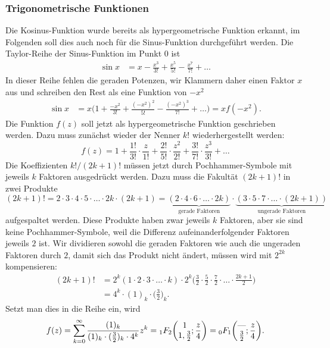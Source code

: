 %
%
\subsubsection{Trigonometrische Funktionen}
%
Die Kosinus-Funktion wurde bereits als hypergeometrische Funktion erkannt,
im Folgenden soll dies auch noch für die Sinus-Funktion
durchgeführt werden.
Die Taylor-Reihe der Sinus-Funktion im Punkt $0$ ist
\begin{align*}
\sin x
&=
x-\frac{x^3}{3!}+\frac{x^5}{5!}-\frac{x^7}{7!}+\dots
\end{align*}
In dieser Reihe fehlen die geraden Potenzen, wir Klammern daher einen
Faktor $x$ aus und schreiben den Rest als eine Funktion von $-x^2$
\begin{align*}
\sin x
&=
x
\biggl(
1+\frac{-x^2}{3!}+\frac{(-x^2)^2}{5!}-\frac{(-x^2)^3}{7!}+\dots
\biggr)
=
x f(-x^2).
\end{align*}
Die Funktion $f(z)$ soll jetzt als hypergeometrische Funktion geschrieben
werden.
Dazu muss zunächst wieder der Nenner $k!$ wiederhergestellt werden:
\begin{equation*}
f(z)
=
1
+
\frac{1!}{3!}\cdot \frac{z}{1!}
+
\frac{2!}{5!}\cdot \frac{z^2}{2!}
+
\frac{3!}{7!}\cdot \frac{z^3}{3!}
+
\dots
\end{equation*}
Die Koeffizienten $k!/(2k+1)!$ müssen jetzt durch Pochhammer-Symbole
mit jeweils $k$ Faktoren ausgedrückt werden.
Dazu muss die Fakultät $(2k+1)!$ in zwei Produkte
\[
(2k+1)!
=
2\cdot 3 \cdot 4\cdot 5\cdot \ldots \cdot 2k \cdot (2k+1)
=
\underbrace{(2\cdot 4 \cdot 6\cdot\ldots\cdot 2k)}_{\textstyle\text{gerade Faktoren}}
\cdot
\underbrace{(3\cdot 5\cdot 7\cdot \ldots \cdot (2k+1))}_{\textstyle\text{ungerade Faktoren}}
\]
aufgespaltet werden.
Diese Produkte haben zwar jeweils $k$ Faktoren, aber sie sind keine
Pochhammer-Symbole, weil die Differenz aufeinanderfolgender Faktoren 
jeweils $2$ ist.
Wir dividieren sowohl die geraden Faktoren wie auch die 
ungeraden Faktoren durch $2$, damit sich das Produkt nicht ändert,
müssen wird mit $2^{2k}$ kompensieren:
\begin{align*}
(2k+1)!
&=
2^k(1\cdot2\cdot3\cdot\ldots\cdot k)
\cdot
2^k
\biggl(
\frac{3}{2}\cdot
\frac{5}{2}\cdot
\frac{7}{2}\cdot
\ldots\cdot
\frac{2k+1}{2}
\biggr)
\\
&=
4^k
\cdot
(1)_k\cdot \biggl(\frac{3}{2}\biggr)_k.
\end{align*}
Setzt man dies in die Reihe ein, wird
\begin{equation}
f(z)
=
\sum_{k=0}^\infty
\frac{(1)_k}{(1)_k\cdot (\frac{3}{2})_k\cdot 4^k}
z^k
=
\mathstrut_1F_2\biggl(
\begin{matrix}1\\1,\frac{3}{2}\end{matrix};\frac{z}4
\biggr)
=
\mathstrut_0F_1\biggl(
\begin{matrix}\text{---}\\\frac{3}{2}\end{matrix};\frac{z}4
\biggr).
\label{buch:rekursion:hyperbolisch:eqn:hilfsfunktionf}
\end{equation}
